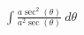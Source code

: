 \documentclass[preview]{standalone}
\begin{document}
\begin{align*}
\int \frac{a\sec^2(\theta)}{a^2\sec(\theta)} \ d\theta
\end{align*}
\end{document}
